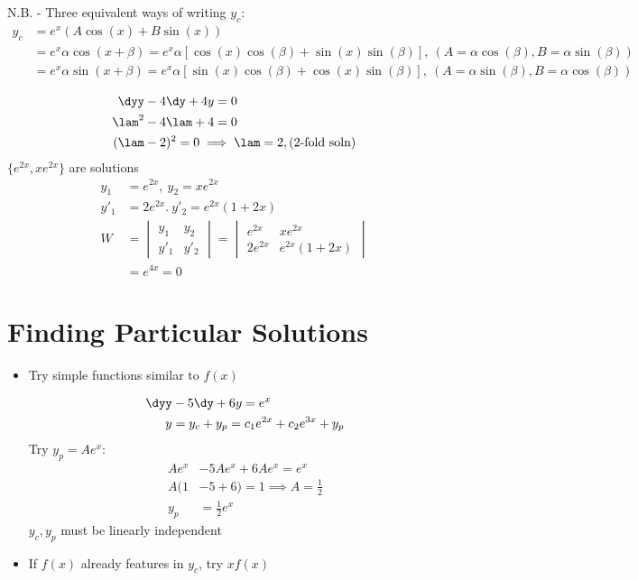 \documentclass[Maths.tex]{subfiles}
\begin{document}
N.B. - Three equivalent ways of writing $y_c$:
\begin{align}
    y_c &= e^x (A\cos(x) + B\sin(x)) \\
    &= e^x \alpha \cos(x + \beta) = e^x \alpha [\cos(x)\cos(\beta) + \sin(x)\sin(\beta)], ~(A = \alpha\cos(\beta), B = \alpha\sin(\beta)) \\
    &= e^x \alpha\sin(x + \beta) = e^x \alpha [\sin(x)\cos(\beta) + \cos(x)\sin(\beta)], ~(A = \alpha\sin(\beta), B = \alpha\cos(\beta))
\end{align}

\begin{example}
\begin{align}
 \dyy &- 4\dy + 4y = 0 \\
 \lam^2 &- 4\lam + 4 = 0  \\
 (\lam &- 2)^2 = 0 \implies \lam = 2, (\text{2-fold soln})
\end{align}
$\{e^{2x},xe^{2x}\}$ are solutions
\begin{align}
    y_1 &= e^{2x}, ~ y_2 = xe^{2x} \\
    y'_1 &= 2e^{2x}. ~ y'_2 = e^{2x}(1 + 2x) \\
    W &= \begin{vmatrix} y_1 & y_2 \\ y'_1 & y'_2 \end{vmatrix} = \begin{vmatrix} e^{2x} & xe^{2x} \\ 2e^{2x} & e^{2x}(1 + 2x) \end{vmatrix} \\
    &= e^{4x} = 0
\end{align}
\end{example}

\section{Finding Particular Solutions}
\begin{itemize}
    \item Try simple functions similar to $f(x)$
    \begin{example}
    \begin{align}
        \dyy &- 5\dy + 6y = e^x \\
        y &= y_c + y_p = c_1 e^{2x} + c_2e^{3x} + y_p
    \end{align}
    Try $y_p = Ae^x$:
    \begin{align}
        Ae^x &- 5Ae^x + 6Ae^x = e^x \\
        A(1 &- 5 + 6) = 1 \implies A = \frac{1}{2} \\
        y_p &= \frac{1}{2}e^x
    \end{align}
    $y_c,y_p$ must be linearly independent
    \end{example}
    \item If $f(x)$ already features in $y_c$, try $xf(x)$
\end{itemize}
\end{document}
